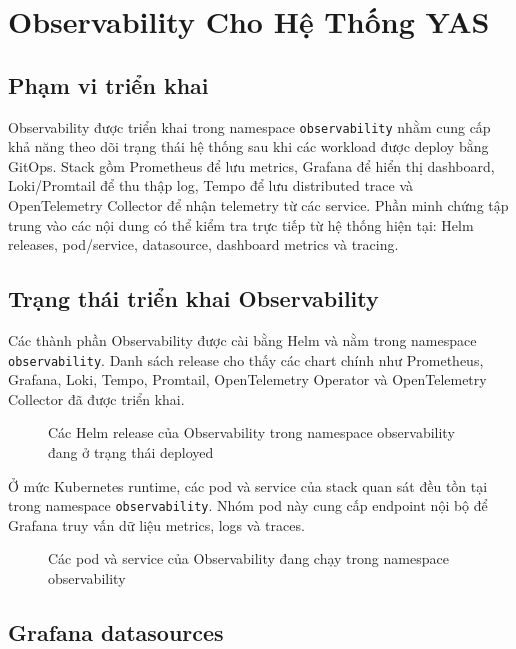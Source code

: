 \section{Observability Cho Hệ Thống YAS}

\subsection{Phạm vi triển khai}

Observability được triển khai trong namespace \texttt{observability} nhằm cung cấp khả năng theo dõi trạng thái hệ thống sau khi các workload được deploy bằng GitOps. Stack gồm Prometheus để lưu metrics, Grafana để hiển thị dashboard, Loki/Promtail để thu thập log, Tempo để lưu distributed trace và OpenTelemetry Collector để nhận telemetry từ các service. Phần minh chứng tập trung vào các nội dung có thể kiểm tra trực tiếp từ hệ thống hiện tại: Helm releases, pod/service, datasource, dashboard metrics và tracing.

\subsection{Trạng thái triển khai Observability}

Các thành phần Observability được cài bằng Helm và nằm trong namespace \texttt{observability}. Danh sách release cho thấy các chart chính như Prometheus, Grafana, Loki, Tempo, Promtail, OpenTelemetry Operator và OpenTelemetry Collector đã được triển khai.

\begin{figure}[H]
\centering
{}
\caption{Các Helm release của Observability trong namespace observability đang ở trạng thái deployed}
\end{figure}

Ở mức Kubernetes runtime, các pod và service của stack quan sát đều tồn tại trong namespace \texttt{observability}. Nhóm pod này cung cấp endpoint nội bộ để Grafana truy vấn dữ liệu metrics, logs và traces.

\begin{figure}[H]
\centering
{}
\caption{Các pod và service của Observability đang chạy trong namespace observability}
\end{figure}

\subsection{Grafana datasources}

